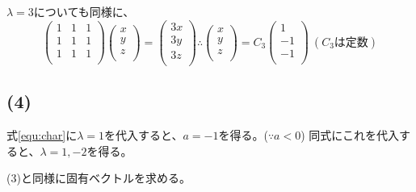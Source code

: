 \documentclass[]{jsarticle}
\begin{document}
        $\lambda = 3$についても同様に、
        \begin{equation*}
            \begin{pmatrix}
                1 & 1 & 1 \\
                1 & 1 & 1 \\
                1 & 1 & 1 \\
            \end{pmatrix}
            \begin{pmatrix}
                x \\
                y \\
                z \\
            \end{pmatrix} =
            \begin{pmatrix}
                3x \\
                3y \\
                3z \\
            \end{pmatrix}
            \therefore
            \begin{pmatrix}
                x \\
                y \\
                z \\
            \end{pmatrix} =
            C_3\begin{pmatrix}
                1 \\
                -1 \\
                -1 \\
            \end{pmatrix} \
            (C_3は定数)
        \end{equation*}
    \subsection*{(4)}
        式\ref{equ:char}に$\lambda = 1$を代入すると、$a = -1$を得る。($\because a < 0$)
        同式にこれを代入すると、$\lambda = 1, -2$を得る。

        (3)と同様に固有ベクトルを求める。
\end{document}
